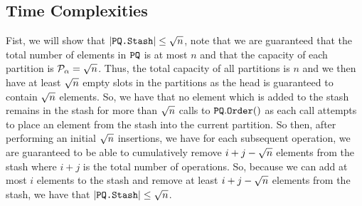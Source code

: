 \subsection{Time Complexities}
Fist, we will show that $|\texttt{PQ.Stash}| \leq {\sqrt{n}}$, note that we are guaranteed that the total number of elements in $\texttt{PQ}$ is at most $n$ and that the capacity of each partition is $\mathcal{P}_\alpha = {\sqrt{n}}$.
Thus, the total capacity of all partitions is $n$ and we then have at least ${\sqrt{n}}$ empty slots in the partitions
as the head is guaranteed to contain ${\sqrt{n}}$ elements. So, we have that no element which is added to the stash remains
in the stash for more than ${\sqrt{n}}$ calls to $\texttt{PQ}.\texttt{Order}()$ as each call attempts to place an element from the stash into the current partition.
So then, after performing an initial ${\sqrt{n}}$ insertions, we have for each subsequent operation, 
we are guaranteed to be able to cumulatively remove $i + j - {\sqrt{n}}$ elements from the stash where $i + j$ is the total number of operations.
So, because we can add at most $i$ elements to the stash and remove at least $i + j - {\sqrt{n}}$ elements from the stash, we have that $|\texttt{PQ.Stash}| \leq {\sqrt{n}}$.

